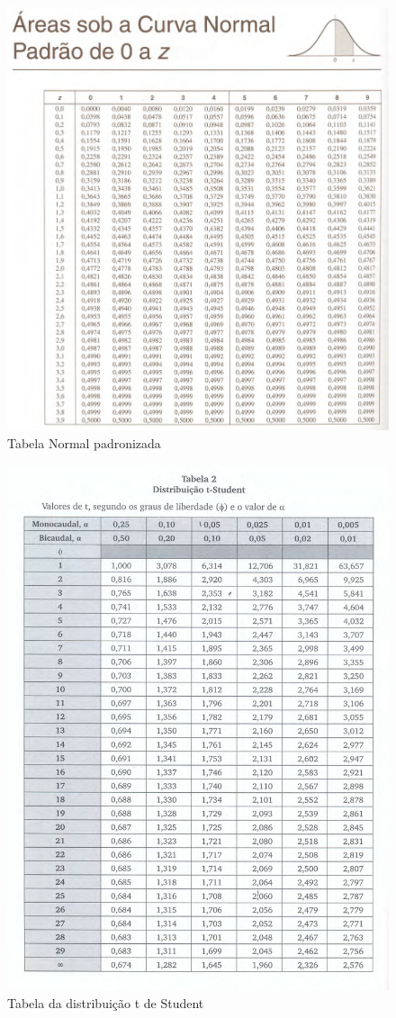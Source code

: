 \documentclass[
]{book}
\begin{document}
\begin{figure}

{\centering \includegraphics[width=0.8\linewidth]{images11/normal_reduzida_old} 

}

\caption{Tabela Normal padronizada}\label{fig:unnamed-chunk-139}
\end{figure}

\hfill\break

\begin{figure}

{\centering \includegraphics[width=0.8\linewidth]{images11/tabela_t} 

}

\caption{Tabela da distribuição t de Student}\label{fig:unnamed-chunk-140}
\end{figure}
\end{document}
